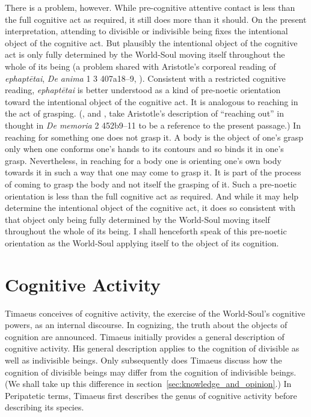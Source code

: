 There is a problem, however. While pre-cognitive attentive contact is less than the full cognitive act as required, it still does more than it should. On the present interpretation, attending to divisible or indivisible being fixes the intentional object of the cognitive act. But plausibly the intentional object of the cognitive act is only fully determined by the World-Soul moving itself throughout the whole of its being (a problem shared with Aristotle's corporeal reading of \emph{ephaptētai}, \emph{De anima} 1 3 407a18--9, \citealt[84, 98--9 n26]{Lee:1976xs}). Consistent with a restricted cognitive reading, \emph{ephaptētai} is better understood as a kind of pre-noetic orientation toward the intentional object of the cognitive act. It is analogous to reaching in the act of grasping. (\citealt[276]{Ross:1906fk}, and \citealt[404 n335]{Cherniss:1944aa}, take Aristotle's description of ``reaching out'' in thought in \emph{De memoria} 2 452b9--11 to be a reference to the present passage.) In reaching for something one does not grasp it. A body is the object of one's grasp only when one conforms one's hands to its contours and so binds it in one's grasp. Nevertheless, in reaching for a body one is orienting one's own body towards it in such a way that one may come to grasp it. It is part of the process of coming to grasp the body and not itself the grasping of it. Such a pre-noetic orientation is less than the full cognitive act as required. And while it may help determine the intentional object of the cognitive act, it does so consistent with that object only being fully determined by the World-Soul moving itself throughout the whole of its being. I shall henceforth speak of this pre-noetic orientation as the World-Soul applying itself to the object of its cognition.



\section{Cognitive Activity} %
\label{sec:cognition}

Timaeus conceives of cognitive activity, the exercise of the World-Soul's cognitive powers, as an internal discourse. In cognizing, the truth about the objects of cognition are announced. Timaeus initially provides a general description of cognitive activity. His general description applies to the cognition of divisible as well as indivisible beings. Only subsequently does Timaeus discuss how the cognition of divisible beings may differ from the cognition of indivisible beings. (We shall take up this difference in section~\ref{sec:knowledge_and_opinion}.) In Peripatetic terms, Timaeus first describes the genus of cognitive activity before describing its species.

